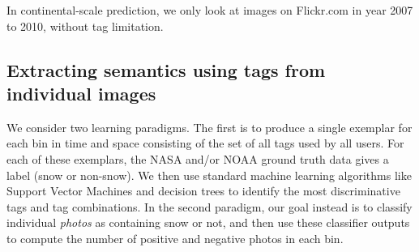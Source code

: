 In continental-scale prediction, we only look at images on Flickr.com in year 2007 to 2010, without tag limitation. 

%




\subsection{Extracting semantics using tags from individual images}

We consider two learning paradigms. The first is to produce a single exemplar for each bin in time and space consisting of the set of all tags used by all users. For each of these
exemplars, the NASA and/or NOAA ground truth data gives a label (snow
or non-snow). We then use standard machine learning algorithms like
Support Vector Machines and decision trees to identify the most
discriminative tags and tag combinations. In the second paradigm, our
goal instead is to classify individual \textit{photos} as containing
snow or not, and then use these classifier outputs to compute the
number of positive and negative photos in each bin. 









